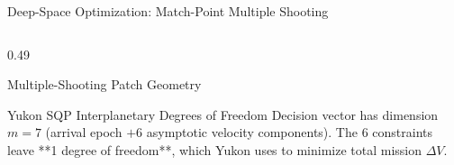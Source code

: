 \documentclass[aspectratio=169, 10pt]{beamer}
\begin{document}
\begin{frame}{Deep-Space Optimization: Match-Point Multiple Shooting}
\begin{columns}[T]
\begin{column}{0.49\textwidth}
\begin{block}{Multiple-Shooting Patch Geometry}
            \end{block}
            \vspace{-0.15cm}
            \begin{alertblock}{Yukon SQP Interplanetary Degrees of Freedom}
                \scriptsize
                Decision vector has dimension $m = 7$ (arrival epoch $+ 6$ asymptotic velocity components). The 6 constraints leave **1 degree of freedom**, which Yukon uses to minimize total mission $\Delta V$.
            \end{alertblock}
        \end{column}
    \end{columns}
\end{frame}
\end{document}
